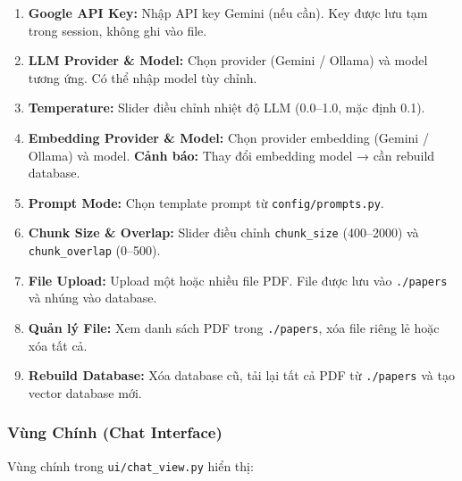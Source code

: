 \documentclass[10pt, conference, a4paper, compsocconf]{IEEEtran}
\begin{document}
\begin{enumerate}
    \item \textbf{Google API Key:} Nhập API key Gemini (nếu cần). Key được lưu tạm trong session, không ghi vào file.
    
    \item \textbf{LLM Provider \& Model:} Chọn provider (Gemini / Ollama) và model tương ứng. Có thể nhập model tùy chỉnh.
    
    \item \textbf{Temperature:} Slider điều chỉnh nhiệt độ LLM (0.0--1.0, mặc định 0.1).
    
    \item \textbf{Embedding Provider \& Model:} Chọn provider embedding (Gemini / Ollama) và model. \textbf{Cảnh báo:} Thay đổi embedding model → cần rebuild database.
    
    \item \textbf{Prompt Mode:} Chọn template prompt từ \texttt{config/prompts.py}.
    
    \item \textbf{Chunk Size \& Overlap:} Slider điều chỉnh \verb|chunk_size| (400--2000) và \verb|chunk_overlap| (0--500).
    
    \item \textbf{File Upload:} Upload một hoặc nhiều file PDF. File được lưu vào \verb|./papers| và nhúng vào database.
    
    \item \textbf{Quản lý File:} Xem danh sách PDF trong \verb|./papers|, xóa file riêng lẻ hoặc xóa tất cả.
    
    \item \textbf{Rebuild Database:} Xóa database cũ, tải lại tất cả PDF từ \verb|./papers| và tạo vector database mới.
\end{enumerate}

\subsubsection{Vùng Chính (Chat Interface)}
Vùng chính trong \texttt{ui/chat\_view.py} hiển thị:
\end{document}
